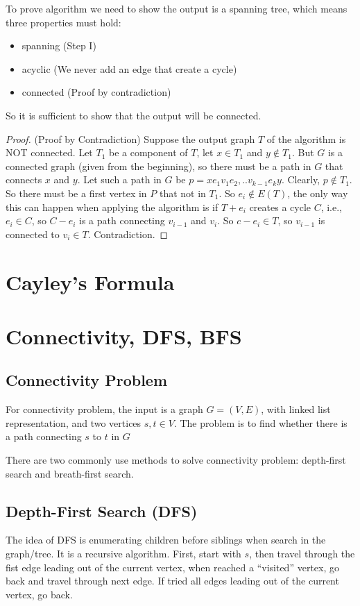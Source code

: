 				To prove algorithm we need to show the output is a spanning tree, which means three properties must hold:
				\begin{itemize}
					\item spanning (Step I)
					\item acyclic (We never add an edge that create a cycle)
					\item connected (Proof by contradiction)
				\end{itemize}
				So it is sufficient to show that the output will be connected.
				\begin{proof}
					(Proof by Contradiction) Suppose the output graph $T$ of the algorithm is NOT connected. Let $T_1$ be a component of $T$, let $x\in T_1$ and $y \notin T_1$. But $G$ is a connected graph (given from the beginning), so there must be a path in $G$ that connects $x$ and $y$. Let such a path in $G$ be $p=xe_1v_1e_2,..v_{k-1}e_ky$. Clearly, $p\notin T_1$. So there must be a first vertex in $P$ that not in $T_1$. So $e_i \notin E(T)$, the only way this can happen when applying the algorithm is if $T + e_i$ creates a cycle $C$, i.e., $e_i \in C$, so $C - e_i$ is a path connecting $v_{i-1}$ and $v_i$. So $c - e_i \in T$, so $v_{i-1}$ is connected to $v_i \in T$. Contradiction. 
				\end{proof}

			\section{Cayley's Formula}

			\section{Connectivity, DFS, BFS}
				\subsection{Connectivity Problem}
					For connectivity problem, the input is a graph $G = (V, E)$, with linked list representation, and two vertices $s, t\in V$. The problem is to find whether there is a path connecting $s$ to $t$ in $G$

					There are two commonly use methods to solve connectivity problem: depth-first search and breath-first search.
				\subsection{Depth-First Search (DFS)}
					The idea of DFS is enumerating children before siblings when search in the graph/tree. It is a recursive algorithm. First, start with $s$, then travel through the fist edge leading out of the current vertex, when reached a ``visited'' vertex, go back and travel through next edge. If tried all edges leading out of the current vertex, go back.

